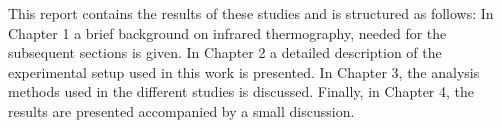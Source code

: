 	This report contains the results of these studies and is structured as follows: In Chapter 1 a brief background on infrared thermography, needed for the subsequent sections is given. In Chapter 2 a detailed description of the experimental setup used in this work is presented. In Chapter 3, the analysis methods used in the different studies is discussed. Finally, in Chapter 4, the results are presented accompanied by a small discussion. 